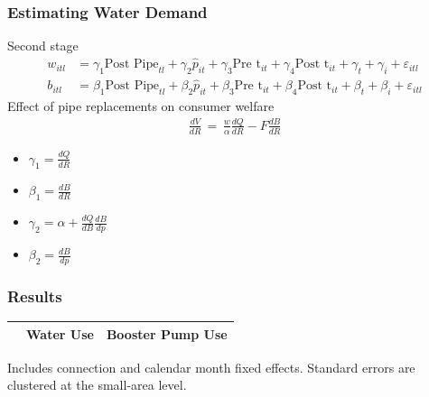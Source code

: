 \documentclass[aspectratio=32]{beamer}
\begin{document}
\begin{frame}
\frametitle{Estimating Water Demand}
Second stage
  \begin{align*}
  w_{itl} &= \gamma_1  \text{Post Pipe}_{tl} + \gamma_2  \hat{p}_{it} + \gamma_3\text{Pre t}_{it} +\gamma_4\text{Post t}_{it} +    \gamma_t +  \gamma_i +  \varepsilon_{itl} \\
  b_{itl} &= \beta_1  \text{Post Pipe}_{tl} + \beta_2  \hat{p}_{it} + \beta_3\text{Pre t}_{it} +\beta_4\text{Post t}_{it} +    \beta_t +  \beta_i +  \varepsilon_{itl} 
  \end{align*}
Effect of pipe replacements on consumer welfare
  \begin{align*}
  \frac{dV}{dR}\,=\,\frac{w}{\alpha} \frac{dQ}{dR} - F \frac{dB}{dR}
  \end{align*}

\begin{itemize}
  \item $\gamma_1 = \frac{dQ}{dR} $
  \item $\beta_1  = \frac{dB}{dR}$
  \item $\gamma_2 = \alpha +  \frac{dQ}{dB} \frac{dB}{dp}$
  \item $\beta_2 = \frac{dB}{dp}$
\end{itemize}

\end{frame}




\begin{frame}
\frametitle{Results}

\begin{table}[h!] 
\centering
\vspace{-2mm}
\begin{threeparttable}
\begin{tabular}{@{}l*{1}{CC}@{}}
\toprule
  & Water Use & Booster Pump Use \\
\midrule

\bottomrule
\end{tabular}
\begin{tablenotes}
\footnotesize
\item Includes connection and calendar month fixed effects.  Standard errors are clustered at the small-area level.
\end{tablenotes}
\end{threeparttable}
\end{table}


\end{frame}
\end{document}
